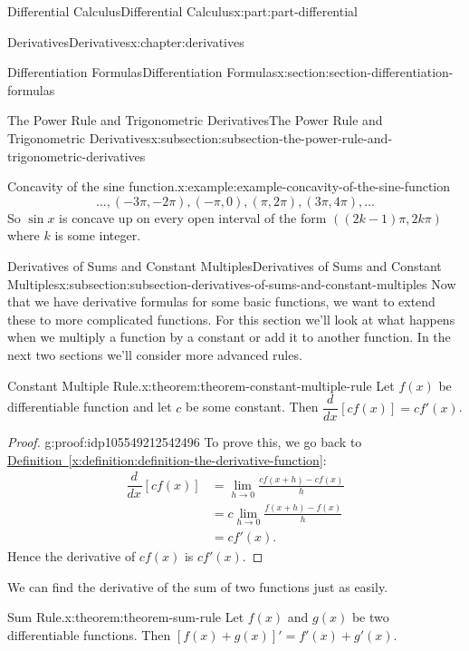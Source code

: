 \documentclass[twoside,10pt,]{book}
\newcommand{\xreffont}{\relax}
\numberwithin{equation}{part}
\newcommand{\dv}[3][]{\dfrac{d^{#1} #2}{d #3^{#1}}}
\begin{document}
\begin{partptx}{Differential Calculus}{}{Differential Calculus}{}{}{x:part:part-differential}
\begin{chapterptx}{Derivatives}{}{Derivatives}{}{}{x:chapter:derivatives}
\begin{sectionptx}{Differentiation Formulas}{}{Differentiation Formulas}{}{}{x:section:section-differentiation-formulas}
\begin{subsectionptx}{The Power Rule and Trigonometric Derivatives}{}{The Power Rule and Trigonometric Derivatives}{}{}{x:subsection:subsection-the-power-rule-and-trigonometric-derivatives}
\begin{example}{Concavity of the sine function.}{x:example:example-concavity-of-the-sine-function}
\begin{equation*}
\ldots, (-3\pi,-2\pi), (-\pi,0),(\pi,2\pi), (3\pi,4\pi),\ldots
\end{equation*}
So \(\sin x\) is concave up on every open interval of the form \(((2k-1)\pi, 2k\pi)\) where \(k\) is some integer.%
\end{example}
\end{subsectionptx}
%
%
\typeout{************************************************}
\typeout{************************************************}
%
\begin{subsectionptx}{Derivatives of Sums and Constant Multiples}{}{Derivatives of Sums and Constant Multiples}{}{}{x:subsection:subsection-derivatives-of-sums-and-constant-multiples}
Now that we have derivative formulas for some basic functions, we want to extend these to more complicated functions. For this section we'll look at what happens when we multiply a function by a constant or add it to another function. In the next two sections we'll consider more advanced rules.%
\begin{theorem}{Constant Multiple Rule.}{}{x:theorem:theorem-constant-multiple-rule}%
%
Let \(f(x)\) be differentiable function and let \(c\) be some constant. Then \(\dv{}{x}[cf(x)] = cf'(x)\).%
\end{theorem}
\begin{proof}{}{g:proof:idp105549212542496}
To prove this, we go back to \hyperref[x:definition:definition-the-derivative-function]{Definition~{\xreffont\ref{x:definition:definition-the-derivative-function}}}:%
\begin{align*}
\dv{}{x}[cf(x)] & = \lim_{h\to0}\frac{cf(x+h) - cf(x)}{h} \\
& = c\lim_{h\to0}\frac{f(x+h) - f(x)}{h} \\
& = cf'(x). 
\end{align*}
Hence the derivative of \(cf(x)\) is \(cf'(x)\).%
\end{proof}
We can find the derivative of the sum of two functions just as easily.%
\begin{theorem}{Sum Rule.}{}{x:theorem:theorem-sum-rule}%
%
Let \(f(x)\) and \(g(x)\) be two differentiable functions. Then \([f(x)+g(x)]' = f'(x) + g'(x)\).%
\end{theorem}
\end{subsectionptx}
\end{sectionptx}
%
%
\typeout{************************************************}

\end{chapterptx}
\end{partptx}
\end{document}
